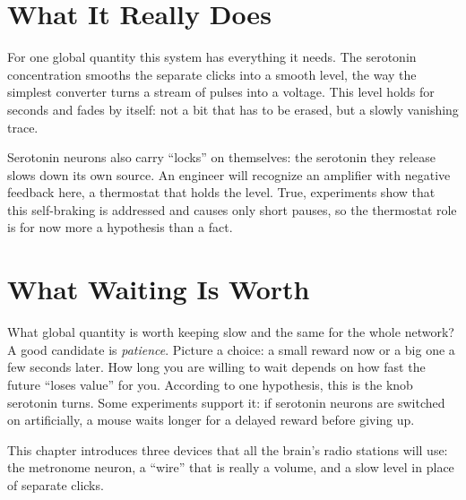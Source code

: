 
\section*{What It Really Does}

For one global quantity this system has everything it needs. The serotonin concentration smooths the separate clicks into a smooth level, the way the simplest converter turns a stream of pulses into a voltage. This level holds for seconds and fades by itself: not a bit that has to be erased, but a slowly vanishing trace.

Serotonin neurons also carry ``locks'' on themselves: the serotonin they release slows down its own source. An engineer will recognize an amplifier with negative feedback here, a thermostat that holds the level. True, experiments show that this self-braking is addressed and causes only short pauses, so the thermostat role is for now more a hypothesis than a fact.

\section*{What Waiting Is Worth}

What global quantity is worth keeping slow and the same for the whole network? A good candidate is \emph{patience}. Picture a choice: a small reward now or a big one a few seconds later. How long you are willing to wait depends on how fast the future ``loses value'' for you. According to one hypothesis, this is the knob serotonin turns. Some experiments support it: if serotonin neurons are switched on artificially, a mouse waits longer for a delayed reward before giving up.

This chapter introduces three devices that all the brain's radio stations will use: the metronome neuron, a ``wire'' that is really a volume, and a slow level in place of separate clicks.

